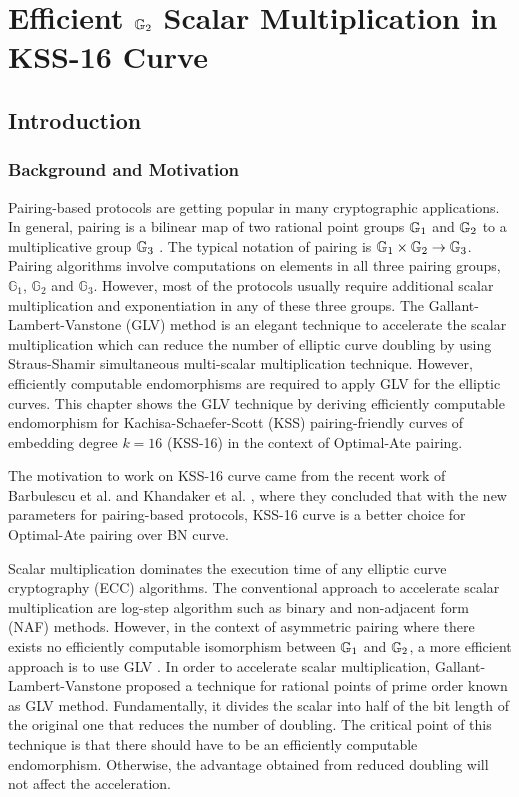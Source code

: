 \chapter{Efficient \texorpdfstring{${\mathbb{G}}_{2}$}{G2} Scalar Multiplication in KSS-16 Curve} 
\label{ch:candar2018}


\section{Introduction}
\subsection{Background and Motivation}
Pairing-based protocols are getting popular in many cryptographic applications. 
In general, pairing is a bilinear map of two rational point groups ${\mathbb{G}}_{1}$ and ${\mathbb{G}}_{2}$ to a multiplicative group ${\mathbb{G}}_{3}$ \cite{Silverman}.
The typical notation of pairing is ${\mathbb{G}}_{1} \times {\mathbb{G}}_{2} \rightarrow {\mathbb{G}}_{3}$.
Pairing algorithms involve computations on elements in all three pairing groups, $\mathbb{G}_1$, $\mathbb{G}_2$ and $\mathbb{G}_3$.
However, most of the protocols usually require additional scalar multiplication and exponentiation in any of these three groups. 
The Gallant-Lambert-Vanstone (GLV) method is an elegant technique to accelerate the scalar multiplication which can reduce the number of elliptic curve doubling by using Straus-Shamir simultaneous multi-scalar multiplication technique.
However, efficiently computable endomorphisms are required to apply GLV for the elliptic curves. 
This chapter shows the GLV technique by deriving efficiently computable endomorphism for Kachisa-Schaefer-Scott (KSS)  \cite{EPRINT:KacSchSco07} pairing-friendly curves of embedding degree $k=16$ (KSS-16) in the context of Optimal-Ate pairing.



The motivation to work on KSS-16 curve came from the recent work of Barbulescu et al. \cite{EPRINT:BarDuq17} and Khandaker et al. \cite{INDOCRYPT:KNGDNK17}, where they concluded that with the new parameters for pairing-based protocols, KSS-16 curve is a better choice for Optimal-Ate pairing over BN curve.

Scalar multiplication dominates the execution time of any elliptic curve cryptography (ECC) algorithms.
The conventional approach to accelerate scalar multiplication are log-step algorithm such as binary and non-adjacent form (NAF) methods.
However, in the context of asymmetric pairing where there exists no efficiently computable isomorphism between ${\mathbb{G}}_{1}$ and ${\mathbb{G}}_{2}$, a more efficient approach is to use GLV \cite{CANS:SNOKM08, khandaker2017improvement}.
In order to accelerate scalar multiplication, Gallant-Lambert-Vanstone \cite{C:GalLamVan01} proposed a technique for rational points of prime order known as GLV method.
Fundamentally, it divides the scalar into half of the bit length of the original one that reduces the number of doubling.
The critical point of this technique is that there should have to be an efficiently computable endomorphism. 
Otherwise, the advantage obtained from reduced doubling will not affect the acceleration. 


